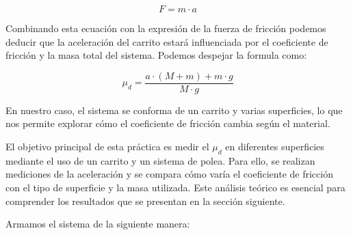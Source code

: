 \documentclass[12pt,a4]{article}
\begin{document}
\[
F = m \cdot a
\]

Combinando esta ecuación con la expresión de la fuerza de fricción podemos deducir que la aceleración del carrito estará influenciada por el coeficiente de fricción y la masa total del sistema. Podemos despejar la formula como:

\begin{equation}
    \mu_d = \frac{a \cdot (M + m) + m \cdot g }{M \cdot g}
    \label{eq:mu_d}
\end{equation}

En nuestro caso, el sistema se conforma de un carrito y varias superficies, lo que nos permite explorar cómo el coeficiente de fricción cambia según el material.

El objetivo principal de esta práctica es medir el $\mu_d$ en diferentes superficies mediante el uso de un carrito y un sistema de polea. Para ello, se realizan mediciones de la aceleración y se compara cómo varía el coeficiente de fricción con el tipo de superficie y la masa utilizada. Este análisis teórico es esencial para comprender los resultados que se presentan en la sección siguiente.

Armamos el sistema de la siguiente manera:

\begin{figure}[H]
    \centering
    \label{fig:system}
\end{figure}
\end{document}
